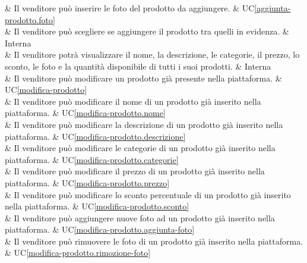  & Il venditore può inserire le foto del prodotto da aggiungere. & UC\ref{aggiunta-prodotto.foto} \\

 & Il venditore può scegliere se aggiungere il prodotto tra quelli in evidenza. & Interna \\
	
 & Il venditore potrà visualizzare il nome, la descrizione, le categorie, il prezzo, lo sconto, le foto e la quantità disponibile di tutti i suoi prodotti. & Interna \\
    
 & Il venditore può modificare un prodotto già presente nella piattaforma. & UC\ref{modifica-prodotto} \\
    
 & Il venditore può modificare il nome di un prodotto già inserito nella piattaforma. & UC\ref{modifica-prodotto.nome} \\
    
 & Il venditore può modificare la descrizione di un prodotto già inserito nella piattaforma. & UC\ref{modifica-prodotto.descrizione} \\
    
 & Il venditore può modificare le categorie di un prodotto già inserito nella piattaforma. & UC\ref{modifica-prodotto.categorie} \\
    
 & Il venditore può modificare il prezzo di un prodotto già inserito nella piattaforma. & UC\ref{modifica-prodotto.prezzo} \\
    
 & Il venditore può modificare lo sconto percentuale di un prodotto già inserito nella piattaforma. & UC\ref{modifica-prodotto.sconto} \\
    
 & Il venditore può aggiungere nuove foto ad un prodotto già inserito nella piattaforma. & UC\ref{modifica-prodotto.aggiunta-foto} \\
    
 & Il venditore può rimuovere le foto di un prodotto già inserito nella piattaforma. & UC\ref{modifica-prodotto.rimozione-foto} \\
    
